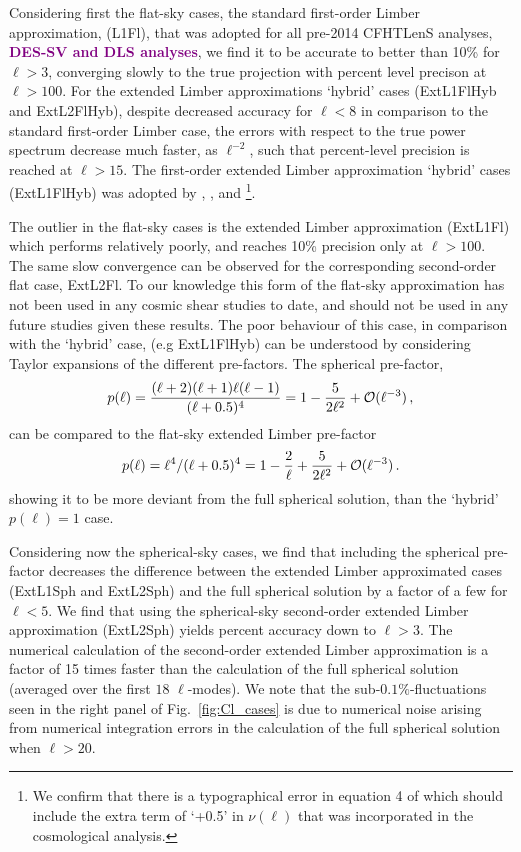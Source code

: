 \documentclass[fleqn,usenatbib]{mnras} %
\newcommand{\ch}[1]{\textcolor{purple}{\textbf{#1}}}
\begin{document}
Considering first the flat-sky cases, the standard first-order Limber
approximation, (L1Fl), that was adopted for all pre-2014 CFHTLenS analyses, \ch{DES-SV and DLS analyses}, we
find it to be accurate to better than 10\% for $\ell>3$, converging slowly to the
true projection with percent level precison at $\ell>100$. For the extended
Limber approximations `hybrid' cases (ExtL1FlHyb and ExtL2FlHyb), despite
decreased accuracy for $\ell < 8$ in comparison to the standard first-order
Limber case, the errors with respect to the true power spectrum decrease much
faster, as $\ell^{-2}$, such that percent-level precision is reached at
$\ell>15$.  The first-order extended Limber approximation `hybrid' cases
(ExtL1FlHyb) was adopted by \citet{joudaki/etal:2016}, \citet{joudaki/etal:2017}, and
\cite{KiDS-450}\footnote{We confirm that there is a typographical error in
equation 4 of \cite{KiDS-450} which should include the extra term of `+0.5' in
$\nu(\ell)$ that was incorporated in the cosmological analysis.}. 

The outlier in the flat-sky cases is the extended Limber approximation
(ExtL1Fl) which performs relatively poorly, and reaches 10\% precision only at
$\ell > 100$. The same slow convergence can be observed for the corresponding
second-order flat case, ExtL2Fl. To our knowledge this form of the flat-sky
approximation has not been used in any cosmic shear studies to date, and should
not be used in any future studies given these results.  The poor behaviour of
this case, in comparison with the `hybrid' case, (e.g ExtL1FlHyb) can be
understood by considering Taylor expansions of the different pre-factors.  The
spherical pre-factor,
%
\begin{equation}
p(\ell) = \frac{(\ell+2)(\ell+1)\ell(\ell-1)}{(\ell + 0.5)^4} = 1-{5\over 2\ell^2} +{\cal O}(\ell^{-3}) \, ,
\end{equation}
%
can be compared to the flat-sky extended Limber pre-factor
%
\begin{equation}
p(\ell) = \ell^4 / (\ell + 0.5)^4 = 1-{2\over \ell}+{5\over 2\ell^2} +{\cal O}(\ell^{-3}) \, . 
\end{equation} 
%
showing it to be more deviant from the full spherical solution, than the
`hybrid' $p(\ell) = 1$ case. 

Considering now the spherical-sky cases, we find that including the spherical
pre-factor decreases the difference between the extended Limber approximated
cases (ExtL1Sph and ExtL2Sph) and the full spherical solution by a factor of a
few for $\ell < 5$.   We find that using the spherical-sky second-order
extended Limber approximation (ExtL2Sph) yields percent accuracy down to $\ell
> 3$.  The numerical calculation of the second-order extended Limber
approximation is a factor of 15 times faster than the calculation of the
full spherical solution (averaged over the first $18$ $\ell$-modes). We
note that the sub-$0.1\%$-fluctuations seen in the right panel of
Fig.~\ref{fig:Cl_cases} is due to numerical noise arising from numerical
integration errors in the calculation of the full spherical solution when $\ell
> 20$.
\end{document}
